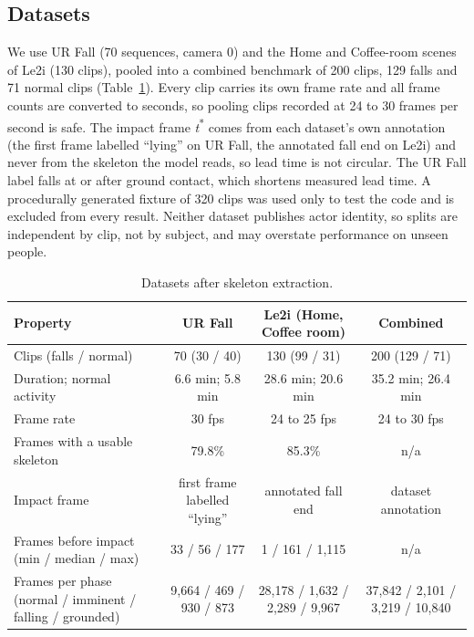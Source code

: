 \documentclass[journal]{IEEEtran}
\begin{document}
\subsection{Datasets}\label{sub:data}

We use UR Fall (70 sequences, camera 0) and the Home and Coffee-room scenes of Le2i (130 clips), pooled into a combined benchmark of 200 clips, 129 falls and 71 normal clips (Table~\ref{tab:data}). Every clip carries its own frame rate and all frame counts are converted to seconds, so pooling clips recorded at 24 to 30 frames per second is safe. The impact frame \textit{t}\textsuperscript{*} comes from each dataset's own annotation (the first frame labelled ``lying'' on UR Fall, the annotated fall end on Le2i) and never from the skeleton the model reads, so lead time is not circular. The UR Fall label falls at or after ground contact, which shortens measured lead time. A procedurally generated fixture of 320 clips was used only to test the code and is excluded from every result. Neither dataset publishes actor identity, so splits are independent by clip, not by subject, and may overstate performance on unseen people.

\begin{table}[!t]
\renewcommand{\arraystretch}{1.15}
\caption{Datasets after skeleton extraction.}
\label{tab:data}
\centering
\footnotesize
\begin{tabular}{lccc}
\hline
Property & UR Fall & Le2i (Home, Coffee room) & Combined \\
\hline
Clips (falls / normal) & 70 (30 / 40) & 130 (99 / 31) & 200 (129 / 71) \\
Duration; normal activity & 6.6 min; 5.8 min & 28.6 min; 20.6 min & 35.2 min; 26.4 min \\
Frame rate & 30 fps & 24 to 25 fps & 24 to 30 fps \\
Frames with a usable skeleton & 79.8\% & 85.3\% & n/a \\
Impact frame & first frame labelled ``lying'' & annotated fall end & dataset annotation \\
Frames before impact (min / median / max) & 33 / 56 / 177 & 1 / 161 / 1,115 & n/a \\
Frames per phase (normal / imminent / falling / grounded) & 9,664 / 469 / 930 / 873 & 28,178 / 1,632 / 2,289 / 9,967 & 37,842 / 2,101 / 3,219 / 10,840 \\
\hline
\end{tabular}
\end{table}
\end{document}
